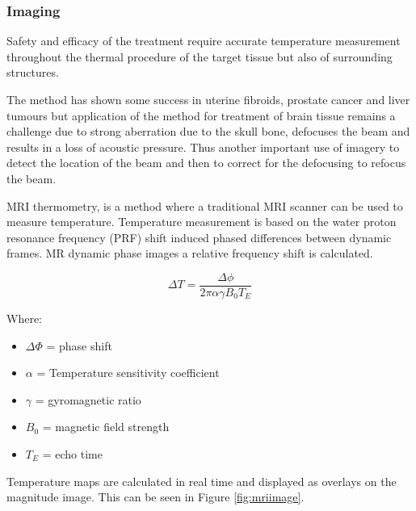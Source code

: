 \documentclass[11pt]{article} %
\begin{document}
	\subsubsection{Imaging}
	Safety and efficacy of the treatment require accurate temperature measurement throughout the thermal procedure of the target tissue but also of surrounding structures.
	
	The method has shown some success in uterine fibroids, prostate cancer and liver tumours but application of the method for treatment of brain tissue remains a challenge due to strong aberration due to the skull bone, defocuses the beam and results in a loss of acoustic pressure. Thus another important use of imagery to detect the location of the beam and then to correct for the defocusing to refocus the beam. 
	
	MRI thermometry, is a method where a traditional MRI scanner can be used to measure temperature. Temperature measurement is based on the water proton resonance frequency (PRF) shift induced phased differences between dynamic frames. MR dynamic phase images a relative frequency shift is calculated. 
	
	\begin{equation}
	\Delta T= \frac{\Delta \phi}{2 \pi \alpha \gamma B_0 T_E}
	\end{equation}
	
	Where: 
	\begin{itemize}
		\item $\Delta \Phi $ = phase shift 
		\item $\alpha$ = Temperature sensitivity coefficient 
		\item $\gamma$ = gyromagnetic ratio
		\item $B_0$ = magnetic field strength
		\item $T_E$ = echo time 
	\end{itemize}

	Temperature maps are calculated in real time and displayed as overlays on the magnitude image. This can be seen in Figure \ref{fig:mriimage}.
	
\end{document}
